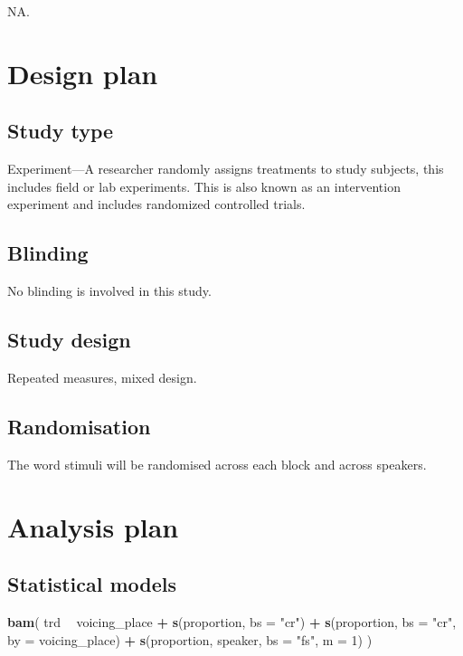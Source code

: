 \documentclass[11pt,]{article}
\newenvironment{Shaded}{\begin{snugshade}}{\end{snugshade}}
\newcommand{\KeywordTok}[1]{\textcolor[rgb]{0.13,0.29,0.53}{\textbf{#1}}}
\newcommand{\DataTypeTok}[1]{\textcolor[rgb]{0.13,0.29,0.53}{#1}}
\newcommand{\DecValTok}[1]{\textcolor[rgb]{0.00,0.00,0.81}{#1}}
\newcommand{\StringTok}[1]{\textcolor[rgb]{0.31,0.60,0.02}{#1}}
\newcommand{\OperatorTok}[1]{\textcolor[rgb]{0.81,0.36,0.00}{\textbf{#1}}}
\newcommand{\NormalTok}[1]{#1}
\begin{document}
NA.

\section{Design plan}\label{design-plan}

\subsection{Study type}\label{study-type}

Experiment---A researcher randomly assigns treatments to study subjects,
this includes field or lab experiments. This is also known as an
intervention experiment and includes randomized controlled trials.

\subsection{Blinding}\label{blinding}

No blinding is involved in this study.

\subsection{Study design}\label{study-design}

Repeated measures, mixed design.

\subsection{Randomisation}\label{randomisation}

The word stimuli will be randomised across each block and across
speakers.

\section{Analysis plan}\label{analysis-plan}

\subsection{Statistical models}\label{statistical-models}

\label{s:stats}

\begin{Shaded}
\begin{Highlighting}[]
\KeywordTok{bam}\NormalTok{(}
\NormalTok{  trd }\OperatorTok{~}
\StringTok{    }\NormalTok{voicing_place }\OperatorTok{+}
\StringTok{    }\KeywordTok{s}\NormalTok{(proportion, }\DataTypeTok{bs =} \StringTok{"cr"}\NormalTok{) }\OperatorTok{+}
\StringTok{    }\KeywordTok{s}\NormalTok{(proportion, }\DataTypeTok{bs =} \StringTok{"cr"}\NormalTok{, }\DataTypeTok{by =}\NormalTok{ voicing_place) }\OperatorTok{+}
\StringTok{    }\KeywordTok{s}\NormalTok{(proportion, speaker, }\DataTypeTok{bs =} \StringTok{"fs"}\NormalTok{, }\DataTypeTok{m =} \DecValTok{1}\NormalTok{)}
\NormalTok{)}
\end{Highlighting}
\end{Shaded}
\end{document}
